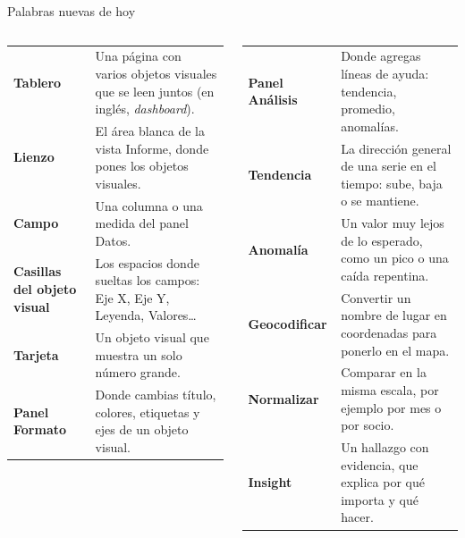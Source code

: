 \documentclass[aspectratio=169,11pt]{beamer}
\begin{document}
\begin{frame}[t]{Palabras nuevas de hoy}
  \scriptsize
  \renewcommand{\arraystretch}{1.12}
  \begin{columns}[T,onlytextwidth]
    \begin{tabular}{@{}L{1.9cm}L{4.45cm}@{}}
      \toprule
      \textbf{Tablero} & Una página con varios objetos visuales que se leen juntos (en inglés, \textit{dashboard}). \\
      \textbf{Lienzo} & El área blanca de la vista Informe, donde pones los objetos visuales. \\
      \textbf{Campo} & Una columna o una medida del panel Datos. \\
      \textbf{Casillas del objeto visual} & Los espacios donde sueltas los campos: Eje X, Eje Y, Leyenda, Valores\ldots \\
      \textbf{Tarjeta} & Un objeto visual que muestra un solo número grande. \\
      \textbf{Panel Formato} & Donde cambias título, colores, etiquetas y ejes de un objeto visual. \\
      \bottomrule
    \end{tabular}
    \begin{tabular}{@{}L{1.9cm}L{4.45cm}@{}}
      \toprule
      \textbf{Panel Análisis} & Donde agregas líneas de ayuda: tendencia, promedio, anomalías. \\
      \textbf{Tendencia} & La dirección general de una serie en el tiempo: sube, baja o se mantiene. \\
      \textbf{Anomalía} & Un valor muy lejos de lo esperado, como un pico o una caída repentina. \\
      \textbf{Geocodificar} & Convertir un nombre de lugar en coordenadas para ponerlo en el mapa. \\
      \textbf{Normalizar} & Comparar en la misma escala, por ejemplo por mes o por socio. \\
      \textbf{Insight} & Un hallazgo con evidencia, que explica por qué importa y qué hacer. \\
      \bottomrule
    \end{tabular}
  \end{columns}
\end{frame}

\end{document}
